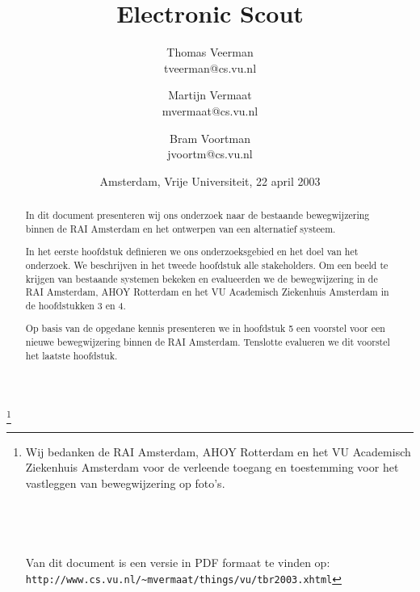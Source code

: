 \documentclass[11pt]{report}
\title{Electronic Scout}
\author{
	Thomas Veerman \\ tveerman@cs.vu.nl
	\and
	Martijn Vermaat \\ mvermaat@cs.vu.nl
        \and
        Bram Voortman \\ jvoortm@cs.vu.nl
}
\date{Amsterdam, Vrije Universiteit, 22 april 2003}
\begin{document}
\maketitle

\thispagestyle{empty}
\thanks{
	Wij bedanken de RAI Amsterdam, AHOY Rotterdam en het VU Academisch Ziekenhuis Amsterdam voor de verleende toegang en toestemming voor het vastleggen van bewegwijzering op foto's.
	\\
	\\
	\\
	\\
	\\
	Van dit document is een versie in PDF formaat te vinden op:\\
	\verb|http://www.cs.vu.nl/~mvermaat/things/vu/tbr2003.xhtml|
}

\begin{abstract}
In dit document presenteren wij ons onderzoek naar de bestaande bewegwijzering binnen de RAI Amsterdam en het ontwerpen van een alternatief systeem.

In het eerste hoofdstuk definieren we ons onderzoeksgebied en het doel van het onderzoek. We beschrijven in het tweede hoofdstuk alle stakeholders. Om een beeld te krijgen van bestaande systemen bekeken en evalueerden we de bewegwijzering in de RAI Amsterdam, AHOY Rotterdam en het VU Academisch Ziekenhuis Amsterdam in de hoofdstukken 3 en 4.

Op basis van de opgedane kennis presenteren we in hoofdstuk 5 een voorstel voor een nieuwe bewegwijzering binnen de RAI Amsterdam. Tenslotte evalueren we dit voorstel het laatste hoofdstuk.
\end{abstract}

\tableofcontents

\listoffigures












\end{document}
